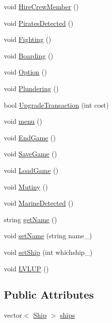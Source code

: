 \begin{DoxyCompactItemize}
\item 
void \hyperlink{class_player_a9a4c059e7aa94a6ee4152351af9d9edd}{Hire\+Crew\+Member} ()
\item 
void \hyperlink{class_player_a305da8fa45422dcd8fe3d5f92e4c6c7f}{Pirates\+Detected} ()
\item 
void \hyperlink{class_player_aea0f1b80c9c3e2ea3beede26b9b2b51a}{Fighting} ()
\item 
void \hyperlink{class_player_ac5e6adb315692e210db2293f846e5d40}{Boarding} ()
\item 
void \hyperlink{class_player_aa1687475b3c27bd0bb904fe5033ea176}{Option} ()
\item 
void \hyperlink{class_player_ac2310aba7bab5049f6ff4c7b3392566e}{Plundering} ()
\item 
bool \hyperlink{class_player_a9e9d22a6d971e8b4618ba3d791f2b72f}{Upgrade\+Transaction} (int cost)
\item 
void \hyperlink{class_player_a90bf77e4e5c33089e3f8136a887ed63a}{menu} ()
\item 
void \hyperlink{class_player_ae73a73ebaf54a546d29cd76e95df1d88}{End\+Game} ()
\item 
void \hyperlink{class_player_af3e4d935acf14a7f75af9e034c84c668}{Save\+Game} ()
\item 
void \hyperlink{class_player_a8eaaa47114a8c0f3be2d81b3949ce728}{Load\+Game} ()
\item 
void \hyperlink{class_player_a00d925d7fbf8af5eb7aaae82667d4968}{Mutiny} ()
\item 
void \hyperlink{class_player_a34f7b1e13c7b3a7bba123ab7bff1cfba}{Marine\+Detected} ()
\item 
string \hyperlink{class_player_af9a6045fa96f736664c4eab4caa5e8e5}{get\+Name} ()
\item 
void \hyperlink{class_player_a39ac9846fd6c4e10721aa1e27aa0fefc}{set\+Name} (string name\+\_\+)
\item 
void \hyperlink{class_player_a6741206aebacced45148788c7f847631}{set\+Ship} (int whichship\+\_\+)
\item 
void \hyperlink{class_player_af9c0820574406f3d4db31bf006aa368d}{L\+V\+L\+UP} ()
\end{DoxyCompactItemize}
\subsection*{Public Attributes}
\begin{DoxyCompactItemize}
\item 
vector$<$ \hyperlink{class_ship}{Ship} $>$ \hyperlink{class_player_ab6c034dcfbb08a9346be1cff7a607cfa}{ships}
\end{DoxyCompactItemize}
